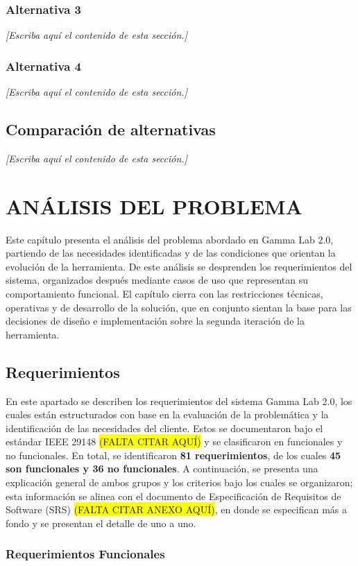 \documentclass[12pt,letterpaper,oneside]{article}
\newcommand{\pendiente}[1][Escriba aquí el contenido de esta sección.]{%
  {\color{gray!75}\itshape [#1]}\par}
\newcommand{\capitulo}[1]{\clearpage\section{#1}}
\begin{document}
\subsubsection{Alternativa 3}
\pendiente

\subsubsection{Alternativa 4}
\pendiente

\subsection{Comparación de alternativas}
\pendiente

\capitulo{ANÁLISIS DEL PROBLEMA}

Este capítulo presenta el análisis del problema abordado en Gamma Lab 2.0, partiendo de las necesidades identificadas y de las condiciones que orientan la evolución de la herramienta. De este análisis se desprenden los requerimientos del sistema, organizados después mediante casos de uso que representan su comportamiento funcional. El capítulo cierra con las restricciones técnicas, operativas y de desarrollo de la solución, que en conjunto sientan la base para las decisiones de diseño e implementación sobre la segunda iteración de la herramienta.

\subsection{Requerimientos}

En este apartado se describen los  requerimientos del sistema Gamma Lab 2.0, los cuales están estructurados con base en la evaluación de la problemática y la identificación de las necesidades del cliente. Estos se documentaron bajo el estándar IEEE 29148 \colorbox{yellow}{(FALTA CITAR AQUÍ)} y se clasificaron en funcionales y no funcionales. En total, se identificaron \textbf{81 requerimientos}, de los cuales \textbf{45 son funcionales y 36 no funcionales}. A continuación,  se presenta una explicación general de ambos grupos y los criterios bajo los cuales se organizaron; esta información se alinea con el documento de Especificación de Requisitos de Software (SRS) \colorbox{yellow}{(FALTA CITAR ANEXO AQUÍ)}, en donde se especifican más a fondo y se presentan el detalle de uno a uno.

\subsubsection{Requerimientos Funcionales}
\end{document}
